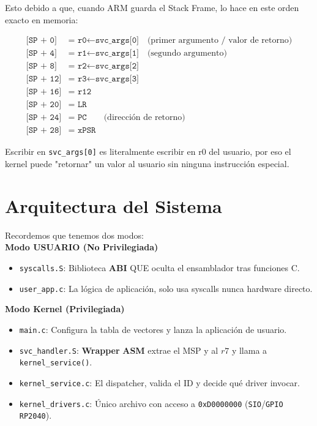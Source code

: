 \documentclass[12pt,letterpaper]{article}
\begin{document}
Esto debido a que, cuando ARM guarda el Stack Frame, lo hace en este orden exacto en memoria:

\begin{align*}
  \texttt{[SP + 0] } &\texttt{=} \texttt{ r0} \leftarrow \texttt{svc\_args[0]} \quad \text{(primer argumento / valor de retorno)}\\
  \texttt{[SP + 4] } &\texttt{=} \texttt{ r1}   \leftarrow \texttt{svc\_args[1]} \quad\text{(segundo argumento)}\\
  \texttt{[SP + 8] } &\texttt{=} \texttt{ r2}   \leftarrow \texttt{svc\_args[2]}\\
  \texttt{[SP + 12]} &\texttt{=} \texttt{ r3}   \leftarrow \texttt{svc\_args[3]}\\
  \texttt{[SP + 16]} &\texttt{=} \texttt{ r12}\\
  \texttt{[SP + 20]} &\texttt{=} \texttt{ LR}\\
  \texttt{[SP + 24]} &\texttt{=} \texttt{ PC} \qquad\text{(dirección de retorno)}\\
  \texttt{[SP + 28]} &\texttt{=} \texttt{ xPSR}
\end{align*}

Escribir en \texttt{svc\_args[0]} es literalmente escribir en r0 del usuario, por eso el kernel puede "retornar" un valor al usuario sin ninguna instrucción especial.

\section*{Arquitectura del Sistema}

Recordemos que tenemos dos modos:\\

\textbf{Modo USUARIO (No Privilegiada)}
\begin{itemize}
\item \texttt{syscalls.S}: Biblioteca \textbf{ABI} QUE oculta el ensamblador tras funciones C.
\item \texttt{user\_app.c}: La lógica de aplicación, solo usa syscalls nunca hardware directo.
\end{itemize}

\textbf{Modo Kernel (Privilegiada)}
\begin{itemize}
\item \texttt{main.c}: Configura la tabla de vectores y lanza la aplicación de usuario.
\item \texttt{svc\_handler.S}: \textbf{Wrapper} \textbf{ASM} extrae el MSP y al $r7$ y llama a \texttt{kernel\_service()}.
\item \texttt{kernel\_service.c}: El dispatcher, valida el ID y decide qué driver invocar.
\item \texttt{kernel\_drivers.c}: Único archivo con acceso a \texttt{0xD0000000} (\texttt{SIO}/\texttt{GPIO RP2040}).
\end{itemize}
\end{document}
